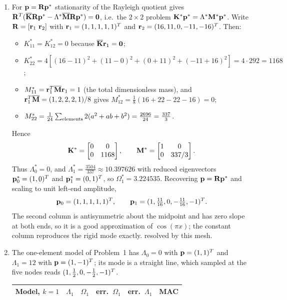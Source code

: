 \documentclass[12pt]{article}
\begin{document}
\begin{enumerate}
    \item For $\mathbf{p}=\mathbf{R}\mathbf{p}^*$ stationarity of the Rayleigh quotient gives $\mathbf{R}^{T}(\overline{\mathbf K}\mathbf{R}\mathbf{p}^*-\Lambda^*\overline{\mathbf M}\mathbf{R}\mathbf{p}^*)=\mathbf{0}$, i.e.\ the $2\times2$ problem $\mathbf{K}^*\mathbf{p}^*=\Lambda^*\mathbf{M}^*\mathbf{p}^*$. Write $\vct R=[\vct r_1\ \vct r_2]$ with $\mathbf{r}_1=(1,1,1,1,1)^{T}$ and $\mathbf{r}_2=(16,11,0,-11,-16)^{T}$. Then:
          \begin{itemize}
              \item $K^*_{11}=K^*_{12}=0$ because $\overline{\mathbf K}\mathbf{r}_1=\mathbf{0}$;
              \item $K^*_{22}=4\left[(16-11)^2+(11-0)^2+(0+11)^2+(-11+16)^2\right]=4\cdot292=1168$;
              \item $M^*_{11}=\mathbf{r}_1^{T}\overline{\mathbf M}\mathbf{r}_1=1$ (the total dimensionless mass), and $\mathbf{r}_1^{T}\overline{\mathbf M}=(1,2,2,2,1)/8$ gives $M^*_{12}=\tfrac18(16+22-22-16)=0$;
              \item $M^*_{22}=\frac1{24}\sum_{\rm elements}2(a^2+ab+b^2)=\frac{2696}{24}=\frac{337}{3}$.
          \end{itemize}
          Hence
          \[
              \mathbf{K}^*=\begin{bmatrix}0&0\\0&1168\end{bmatrix},\qquad
              \mathbf{M}^*=\begin{bmatrix}1&0\\0&337/3\end{bmatrix}.
          \]
          Thus $\Lambda^*_0=0$, and $\Lambda^*_1=\frac{3504}{337}\approx10.397626$ with reduced eigenvectors $\mathbf{p}_0^*=(1,0)^{T}$ and $\mathbf{p}_1^*=(0,1)^{T}$, so $\Omega_1^*=3.224535$. Recovering $\mathbf{p}=\mathbf{R}\mathbf{p}^*$ and scaling to unit left-end amplitude,
          \[
              \mathbf{p}_0=(1,1,1,1,1)^{T},\qquad
              \mathbf{p}_1=(1,\tfrac{11}{16},0,-\tfrac{11}{16},-1)^{T} .
          \]
          The second column is antisymmetric about the midpoint and has zero slope at both ends, so it is a good approximation of $\cos(\pi x)$; the constant column reproduces the rigid mode exactly.
          resolved by this mesh.
    \item The one-element model of Problem~1 has $\Lambda_0=0$ with $\mathbf{p}=(1,1)^{T}$ and $\Lambda_1=12$ with $\mathbf{p}=(1,-1)^{T}$; its mode is a straight line, which sampled at the five nodes reads $(1,\tfrac12,0,-\tfrac12,-1)^{T}$.
          \begin{center}
              \small\setlength{\tabcolsep}{3pt}
              \begin{tabular}{@{}lrrrrr@{}}
                  \toprule
                  Model, $k=1$      & $\Lambda_1$ & $\Omega_1$ & err.\ $\Omega_1$ & err.\ $\Lambda_1$ & MAC        \\
                  \midrule

\end{tabular}
\end{center}
\end{enumerate}
\end{document}
